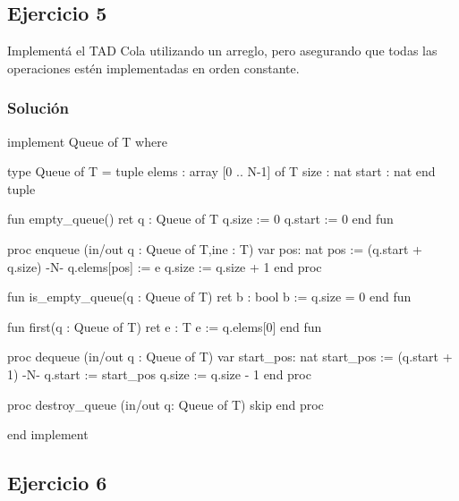 \newpage
\subsection{Ejercicio 5}
Implementá el TAD Cola utilizando un arreglo, pero asegurando que todas las operaciones estén implementadas en orden constante.

\subsubsection{Solución}
\begin{codebox}
\begin{pascallike}
implement Queue of T where

type Queue of T = tuple
                    elems : array [0 .. N-1] of T
                    size : nat
                    start : nat 
                  end tuple

fun empty_queue() ret q : Queue of T
    q.size := 0
    q.start := 0
end fun

proc enqueue (in/out q : Queue of T,ine : T)
    var pos: nat
    pos := (q.start + q.size) {-N-}
    q.elems[pos] := e
    q.size := q.size + 1
end proc

fun is_empty_queue(q : Queue of T) ret b : bool
    b := q.size = 0
end fun

fun first(q : Queue of T) ret e : T
    e := q.elems[0]
end fun

proc dequeue (in/out q : Queue of T)
    var start_pos: nat
    start_pos := (q.start + 1) {-N-}
    q.start := start_pos
    q.size := q.size - 1
end proc

proc destroy_queue (in/out q: Queue of T)
    skip
end proc

end implement
\end{pascallike}
\end{codebox}

\newpage
\subsection{Ejercicio 6}
